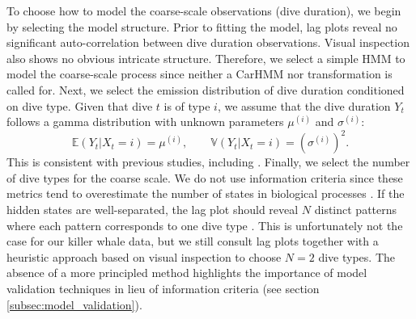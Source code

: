 To choose how to model the coarse-scale observations (dive duration), we begin by selecting the model structure. Prior to fitting the model, lag plots reveal no significant auto-correlation between dive duration observations. Visual inspection also shows no obvious intricate structure. Therefore, we select a simple HMM to model the coarse-scale process since neither a CarHMM nor transformation is called for.
%
Next, we select the emission distribution of dive duration conditioned on dive type. Given that dive $t$ is of type $i$, we assume that the dive duration $Y_t$ follows
a gamma distribution with unknown parameters $\mu^{(i)}$ and $\sigma^{(i)}$:
%
$$\mathbb{E}(Y_t|X_t = i) = \mu^{(i)}, \qquad \mathbb{V}(Y_t|X_t = i) = \left(\sigma^{(i)}\right)^2.$$
%
This is consistent with previous studies, including \citet{Barajas:2017}. 
%
Finally, we select the number of dive types for the coarse scale. We do not use information criteria since these metrics tend to overestimate the number of states in biological processes \citep{Pohle:2017}. If the hidden states are well-separated, the lag plot should reveal $N$ distinct patterns where each pattern corresponds to one dive type \citep{Lawler:2019}. This is unfortunately not the case for our killer whale data, but we still consult lag plots together with a heuristic approach based on visual inspection to choose $N = 2$ dive types. The absence of a more principled method highlights the importance of model validation techniques in lieu of information criteria (see section \ref{subsec:model_validation}).

